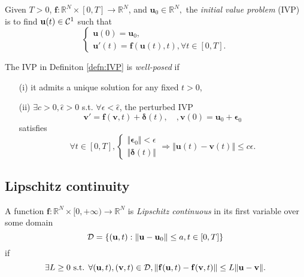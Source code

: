 \begin{defn}\label{defn:IVP}
  Given $T>0$, $\mathbf{f}:\mathbb{R}^N\times [0,T]\rightarrow
  \mathbb{R}^N$, and $\mathbf{u}_0\in \mathbb{R}^N,$
  the \emph{initial value problem} (IVP) is to find
  $\mathbf{u}(t)\in{\cal C}^1$ such that
  \begin{equation}
    \label{eq:ivp}
    \begin{cases}
      \mathbf{u}(0)=\mathbf{u}_0,\\
      \mathbf{u}'(t)=\mathbf{f}(\mathbf{u}(t),t),\forall t\in [0,T].
    \end{cases}
  \end{equation}
\end{defn}

\begin{defn}
  The IVP in Definiton \ref{defn:IVP} is \emph{well-posed} if
  \begin{enumerate}
  \item [(i)] it admits a unique solution for any fixed $t>0$,
  \item [(ii)] $\exists c>0,\hat{\epsilon}>0$ s.t.
    $\forall \epsilon< \hat{\epsilon}$, the perturbed IVP
    \begin{equation}
      \label{eq:perturbedIVP}
      \mathbf{v}'=\mathbf{f}(\mathbf{v},t)+\mathbf{\delta}(t),
      \quad,\mathbf{v}(0)=\mathbf{u}_0+\mathbf{\epsilon}_0
    \end{equation}
satisfies
\begin{equation}
  \forall t\in [0,T],
  \begin{cases}
    \Vert \mathbf{\epsilon}_0\Vert  < \epsilon\\
    \Vert \mathbf{\delta}(t)\Vert 
  \end{cases}
  \Rightarrow \Vert \mathbf{u}(t)-\mathbf{v}(t)\Vert\leq c\epsilon.
\end{equation}
  \end{enumerate}
\end{defn}

\subsection{Lipschitz continuity}

\label{sec:lipschitz-continuity}

\begin{defn}
  A function $\mathbf{f}:\mathbb{R}^N\times [0,+\infty)\rightarrow
  \mathbb{R}^N$ is \emph{Lipschitz continuous} in its first variable
  over some domain
  \begin{equation}
    \label{eq:domain}
    {\cal D}=\{(\mathbf{u},t):\Vert\mathbf{u}-\mathbf{u}_0\Vert
    \leq a,t\in [0,T]\}
  \end{equation}
if
\begin{equation}
  \exists L\geq 0 \textmd{ s.t. } \forall (\mathbf{u},t),
  (\mathbf{v},t)\in {\cal D},\Vert \mathbf{f}(\mathbf{u},t)-\mathbf{f}
  (\mathbf{v},t)\Vert\leq L\Vert \mathbf{u}-\mathbf{v}\Vert.
\end{equation}
\end{defn}

